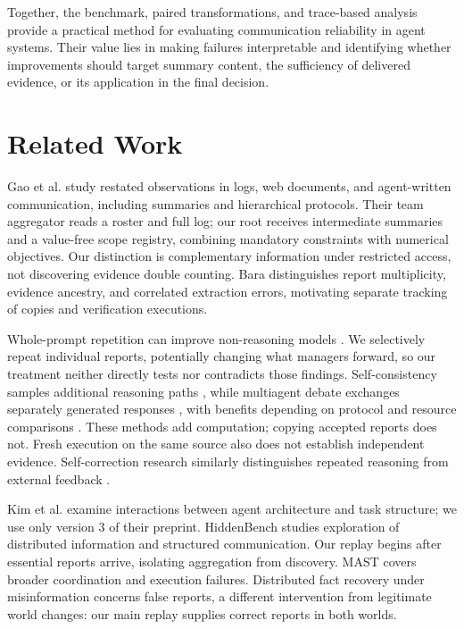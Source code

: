 \documentclass{svproc}
\begin{document}
Together, the benchmark, paired transformations, and trace-based analysis provide a practical method for evaluating communication reliability in agent systems. Their value lies in making failures interpretable and identifying whether improvements should target summary content, the sufficiency of delivered evidence, or its application in the final decision.





\section{Related Work}
Gao et al. \cite{copies} study restated observations in logs, web documents, and agent-written communication, including summaries and hierarchical protocols. Their team aggregator reads a roster and full log; our root receives intermediate summaries and a value-free scope registry, combining mandatory constraints with numerical objectives. Our distinction is complementary information under restricted access, not discovering evidence double counting. Bara \cite{sybil} distinguishes report multiplicity, evidence ancestry, and correlated extraction errors, motivating separate tracking of copies and verification executions.

Whole-prompt repetition can improve non-reasoning models \cite{promptrepeat}. We selectively repeat individual reports, potentially changing what managers forward, so our treatment neither directly tests nor contradicts those findings. Self-consistency samples additional reasoning paths \cite{selfconsistency}, while multiagent debate exchanges separately generated responses \cite{debate}, with benefits depending on protocol and resource comparisons \cite{smit}. These methods add computation; copying accepted reports does not. Fresh execution on the same source also does not establish independent evidence. Self-correction research similarly distinguishes repeated reasoning from external feedback \cite{selfcorrect}.

Kim et al. \cite{scaling} examine interactions between agent architecture and task structure; we use only version 3 of their preprint. HiddenBench \cite{hidden} studies exploration of distributed information and structured communication. Our replay begins after essential reports arrive, isolating aggregation from discovery. MAST \cite{mast} covers broader coordination and execution failures. Distributed fact recovery under misinformation \cite{distributed} concerns false reports, a different intervention from legitimate world changes: our main replay supplies correct reports in both worlds.
\end{document}

